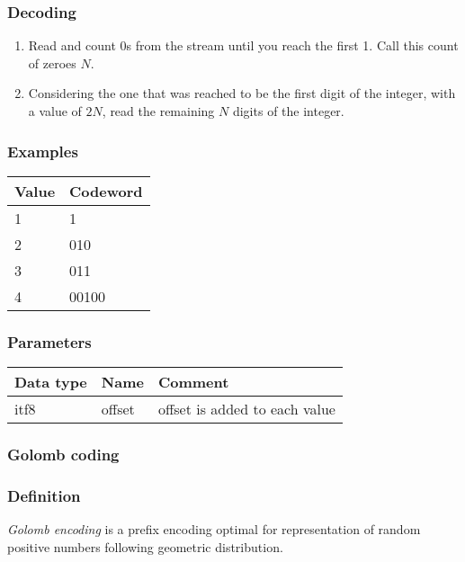 \documentclass[a4paper]{article}
\begin{document}
\subsubsection*{Decoding}

\begin{enumerate}
\item Read and count 0s from the stream until you reach the first 1. Call this count 
of zeroes $N$.

\item Considering the one that was reached to be the first digit of the integer, with 
a value of $2N$, read the remaining $N$ digits of the integer.
\end{enumerate}

\subsubsection*{Examples}

\begin{tabular}{|>{\raggedright}p{76pt}|>{\raggedright}p{107pt}|}
\hline
\textbf{Value} & \textbf{Codeword}\tabularnewline
\hline
1 & 1\tabularnewline
\hline
2 & 010\tabularnewline
\hline
3 & 011\tabularnewline
\hline
4 & 00100\tabularnewline
\hline
\end{tabular}

\subsubsection*{Parameters}

\begin{tabular}{|>{\raggedright}p{144pt}|>{\raggedright}p{144pt}|>{\raggedright}p{144pt}|}
\hline
\textbf{Data type} & \textbf{Name} & \textbf{Comment}\tabularnewline
\hline
itf8 & offset & offset is added to each value\tabularnewline
\hline
\end{tabular}

\subsubsection*{Golomb coding}

\subsubsection*{Definition}

\emph{Golomb encoding} is a prefix encoding optimal for representation of random 
positive numbers following geometric distribution. 
\end{document}
